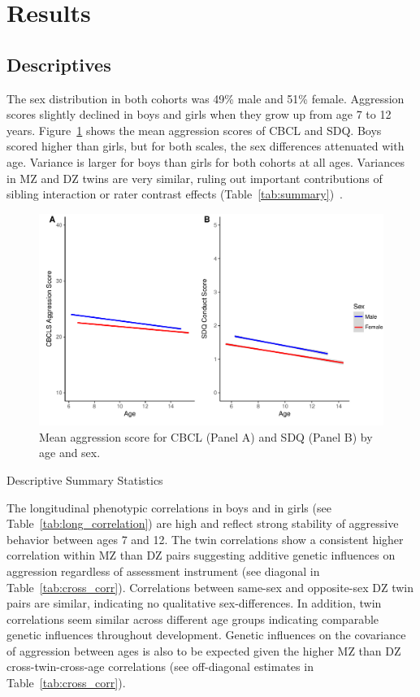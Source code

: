 ﻿\section{Results}
\subsection{Descriptives}
The sex distribution in both cohorts was 49\% male and 51\% female.
Aggression scores slightly declined in boys and girls when they grow up from age 7 to 12 years.
Figure~\ref{fig:meanAggression} shows the mean aggression scores of CBCL and SDQ\@.
Boys scored higher than girls, but for both scales, the sex differences attenuated with age.
Variance is larger for boys than girls for both cohorts at all ages.
Variances in MZ and DZ twins are very similar, ruling out important contributions of sibling interaction or rater contrast effects (Table~\ref{tab:summary})~\cite{Eaves1978, Balakrishnan2014}.


\begin{figure}[htpb]
  \centering
  \includegraphics[width=0.8\linewidth]{longHera/figure/aggression_mean_score.pdf}
  \caption[Mean Aggression score]{Mean aggression score for CBCL (Panel A) and SDQ (Panel B) by age and sex.}
  \label{fig:meanAggression}
\end{figure}
\begin{table}[hbt]
  \centering
  \caption[Descriptive Summary Statistics of CBCL and SDQ]{Descriptive Summary Statistics}\label{tab:summary}
\end{table}
The longitudinal phenotypic correlations in boys and in girls (see Table~\ref{tab:long_correlation}) are high and reflect strong stability of aggressive behavior between ages 7 and 12.
The twin correlations show a consistent higher correlation within MZ than DZ pairs suggesting additive genetic influences on aggression regardless of assessment instrument (see diagonal in Table~\ref{tab:cross_corr}).
Correlations between same-sex and opposite-sex DZ twin pairs are similar, indicating no qualitative sex-differences.
In addition, twin correlations seem similar across different age groups indicating comparable genetic influences throughout development.
Genetic influences on the covariance of aggression between ages is also to be expected given the higher MZ than DZ cross-twin-cross-age correlations (see off-diagonal estimates in Table~\ref{tab:cross_corr}). 

